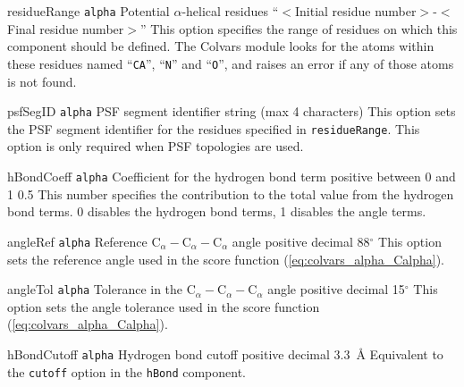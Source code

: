 {\begin{cvcoptions}

\item %
  \key
    {residueRange}{%
      \texttt{alpha}}{%
      Potential $\alpha$-helical residues}{%
    ``$<$Initial residue number$>$-$<$Final residue number$>$''}{%
    This option specifies the range of residues on which this
    component should be defined.  The Colvars module looks for the
    atoms within these residues named ``\texttt{CA}'', ``\texttt{N}''
    and ``\texttt{O}'', and raises an error if any of those atoms is
    not found.}

\item %
  \key
    {psfSegID}{%
    \texttt{alpha}}{%
    PSF segment identifier}{%
    string (max 4 characters)}{%
    This option sets the PSF segment identifier for the residues
    specified in \texttt{residueRange}.  This option is only required
    when PSF topologies are used.}


\item %
  \keydef
    {hBondCoeff}{%
    \texttt{alpha}}{%
    Coefficient for the hydrogen bond term}{%
    positive between 0 and 1}{%
    0.5}{%
    This number specifies the contribution to the total value from the
    hydrogen bond terms.  0 disables the hydrogen bond terms, 1
    disables the angle terms.}

\item %
  \keydef
    {angleRef}{%
    \texttt{alpha}}{%
    Reference $\mathrm{C}_{\alpha} -
    \mathrm{C}_{\alpha} - \mathrm{C}_{\alpha}$ angle}{%
    positive decimal}{%
    88$^{\circ}$}{%
    This option sets the reference angle used in the score function
    (\ref{eq:colvars_alpha_Calpha}).}

\item %
  \keydef
    {angleTol}{%
    \texttt{alpha}}{%
    Tolerance in the $\mathrm{C}_{\alpha} -
    \mathrm{C}_{\alpha} - \mathrm{C}_{\alpha}$ angle}{%
    positive decimal}{%
    15$^{\circ}$}{%
    This option sets the angle tolerance used in the score function
    (\ref{eq:colvars_alpha_Calpha}).}

\item %
  \keydef
    {hBondCutoff}{%
    \texttt{alpha}}{%
    Hydrogen bond cutoff}{%
    positive decimal}{%
    3.3~\AA{}}{%
    Equivalent to the \texttt{cutoff} option in the \texttt{hBond}
    component.}


\end{cvcoptions}}
